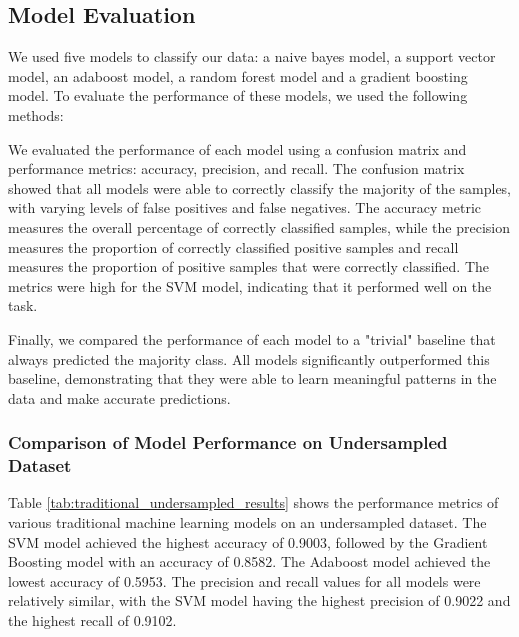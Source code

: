 \documentclass[12pt, a4paper]{article}
\begin{document}
\subsection{Model Evaluation}

We used five models to classify our data: a naive bayes model, a support vector model, an adaboost model, a random forest model and a gradient boosting model. To evaluate the performance of these models, we used the following methods:

We evaluated the performance of each model using a confusion matrix and performance metrics: accuracy, precision, and recall. The confusion matrix showed that all models were able to correctly classify the majority of the samples, with varying levels of false positives and false negatives. The accuracy metric measures the overall percentage of correctly classified samples, while the precision measures the proportion of correctly classified positive samples and recall measures the proportion of positive samples that were correctly classified. The metrics were high for the SVM model, indicating that it performed well on the task.

Finally, we compared the performance of each model to a "trivial" baseline that always predicted the majority class. All models significantly outperformed this baseline, demonstrating that they were able to learn meaningful patterns in the data and make accurate predictions.


\subsubsection{Comparison of Model Performance on Undersampled Dataset}

Table \ref{tab:traditional_undersampled_results} shows the performance metrics of various traditional machine learning models on an undersampled dataset. The SVM model achieved the highest accuracy of 0.9003, followed by the Gradient Boosting model with an accuracy of 0.8582. The Adaboost model achieved the lowest accuracy of 0.5953. The precision and recall values for all models were relatively similar, with the SVM model having the highest precision of 0.9022 and the highest recall of 0.9102.
\end{document}
